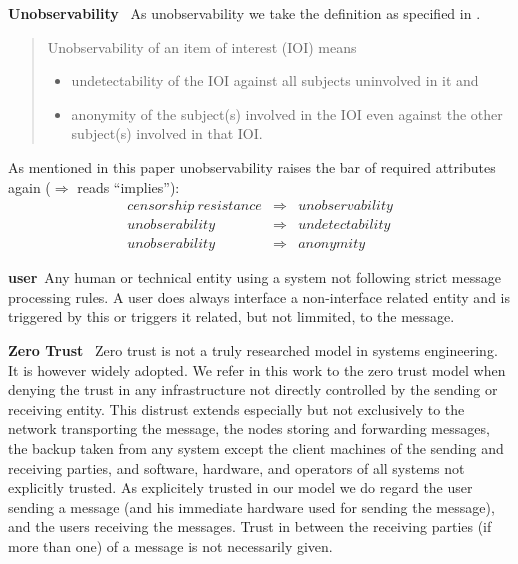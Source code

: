 \documentclass[a4paper,appendixprefix,pdfusetitle,twocolumn,fontsize=8pt,attachdocs,draft,status=draft]{scrbook}
\newenvironment{entry}{\par\leavevmode\hangpara{1.5mm}{1}\ignorespaces}{\RaggedRight\par}
\newcommand*{\mainentry}[2]{{\bfseries{#1\label{def:#1}}}~#2\par}
\begin{document}
\begin{entry}
	\mainentry{Unobservability}{
		As unobservability we take the definition as specified in \cite{anon_terminology}.
		\begin{quote}
			Unobservability of an item of interest (IOI) means
			\begin{itemize}
				\item undetectability of the IOI against all subjects uninvolved in it and
				\item anonymity of the subject(s) involved in the IOI even against the other subject(s) involved in that IOI.
			\end{itemize}
		\end{quote}		
		As mentioned in this paper unobservability raises the bar of required attributes again ($\Rightarrow$ reads ``implies''):
		\begin{eqnarray*}
			censorship\ resistance & \Rightarrow & unobservability\\
			unobserability         & \Rightarrow & undetectability\\
			unobserability         & \Rightarrow & anonymity
		\end{eqnarray*}
	}
\end{entry}


\begin{entry}
	\mainentry{user}{Any human or technical entity using a system not following strict message processing rules. A user does always interface a non-interface related entity and is triggered by this or triggers it related, but not limmited, to the message.}
\end{entry}

\begin{entry}
	\mainentry{Zero Trust}{
		Zero trust is not a truly researched model in systems engineering. It is however widely adopted. We refer in this work to the zero trust model when denying the trust in any infrastructure not directly controlled by the sending or receiving entity. This distrust extends especially but not exclusively to the network transporting the message, the nodes storing and forwarding messages, the backup taken from any system except the client machines of the sending and receiving parties, and software, hardware, and operators of all systems not explicitly trusted. As explicitely trusted in our model we do regard the user sending a message (and his immediate hardware used for sending the message), and the users receiving the messages. Trust in between the receiving parties (if more than one) of a message is not necessarily given.
	}
\end{entry}		
\end{document}
